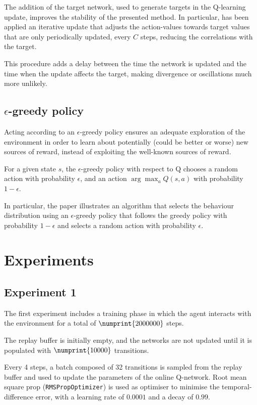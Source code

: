 \documentclass[a4paper,12pt]{article} %
\begin{document}
	The addition of the target network, used to generate targets in the Q-learning update, improves the stability of the presented method. 
	In particular, has been applied an iterative update that adjusts the action-values towards target values that are only periodically updated, every $C$ steps, reducing the correlations with the target.
	
	This procedure adds a delay between the time the network is updated and the time when the update affects the target, making divergence or oscillations much more unlikely.
	
	\subsection*{$\epsilon$-greedy policy}
	Acting according to an $\epsilon$-greedy policy ensures an adequate exploration of the environment in order to learn about potentially (could be better or worse) new sources of reward, instead of exploiting the well-known sources of reward.
	
	For a given state $s$, the $\epsilon$-greedy policy with respect to Q chooses a random action with probability $\epsilon$, and an action $\arg \max_a Q(s, a)$ with probability $1 - \epsilon$.
	
	In particular, the paper illustrates an algorithm that selects the behaviour distribution using an $\epsilon$-greedy policy that follows the greedy policy with probability $1 - \epsilon$ and selects a random action with probability $\epsilon$.
	
	\section{Experiments}
	\subsection*{Experiment 1}
	The first experiment includes a training phase in which the agent interacts with the environment for a total of $\numprint{2000000}$ steps.
	
	The replay buffer is initially empty, and the networks are not updated until it is populated with $\numprint{10000}$ transitions. 
	
	Every 4 steps, a batch composed of 32 transitions is sampled from the replay buffer and used to update the parameters of the online Q-network.
	Root mean square prop (\texttt{RMSPropOptimizer}) is used as optimiser to minimise the temporal-difference error, with a learning rate of ${0.0001}$ and a decay of $0.99$. 
	
\end{document}
